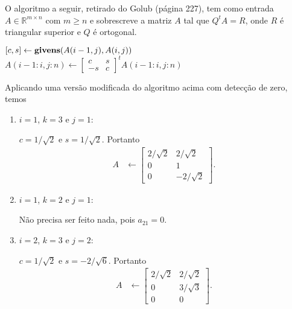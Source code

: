 \begin{questions}
\begin{parts}
\begin{solution}
            O algoritmo a seguir, retirado do Golub\nocite{Golub:1996:matrix} (p\'{a}gina 227), tem como entrada $A \in \mathbb{R}^{m \times n}$ com $m \geq n$ e sobrescreve a matriz $A$ tal que $Q^t A = R$, onde $R$ \'{e} triangular superior e $Q$ \'{e} ortogonal.
            \begin{algorithmic}
                        \State $[c, s] \leftarrow \text{\bf givens}(A(i - 1, j), A(i, j))$
                        \State $A(i - 1:i, j:n) \leftarrow \begin{bmatrix}
                            c & s \\
                            -s & c
                        \end{bmatrix}^t A(i - 1:i, j:n)$
                    \EndFor
                \EndFor
            \end{algorithmic}

            Aplicando uma vers\~{a}o modificada do algoritmo acima com detec\c{c}\~{a}o de zero, temos
            \begin{enumerate}
                \item $i = 1$, $k = 3$ e $j = 1$:

                    $c = 1 / \sqrt{2}$ e $s = 1 / \sqrt{2}$. Portanto
                    \begin{align*}
                        A &\leftarrow \begin{bmatrix}
                            2 / \sqrt{2} & 2 / \sqrt{2} \\
                            0 & 1 \\
                            0 & - 2 / \sqrt{2}
                        \end{bmatrix}.
                    \end{align*}
                    
                \item $i = 1$, $k = 2$ e $j = 1$:

                    N\~{a}o precisa ser feito nada, pois $a_{21} = 0$.

                \item $i = 2$, $k = 3$ e $j = 2$:

                    $c = 1 / \sqrt{2}$ e $s = -2 / \sqrt{6}$. Portanto
                    \begin{align*}
                        A &\leftarrow \begin{bmatrix}
                            2 / \sqrt{2} & 2 / \sqrt{2} \\
                            0 & 3 / \sqrt{3} \\
                            0 & 0
                        \end{bmatrix}.
                    \end{align*}
            \end{enumerate}
        \end{solution}


\end{parts}
\end{questions}
